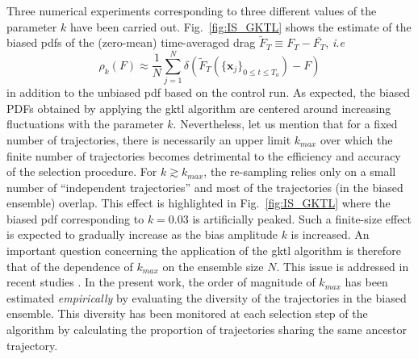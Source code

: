 \documentclass[pre,aps,floatfix,10pt,superscriptaddress, notitlepage,preprint]{revtex4-1}
\begin{document}
Three numerical experiments corresponding to three different values of the parameter $k$ have been carried out.
%
%
%
%
Fig.~\ref{fig:IS_GKTL} shows the estimate of the biased \ac{pdf}s of the (zero-mean) time-averaged drag $\tilde F_T \equiv F_T - \overline{F_T}$, \emph{i.e}
\begin{equation}
  \label{eq:estimate_biased_measure}
  \rho_k(F) 
  \approx \frac{1}{N}\sum_{j=1}^{N}\delta(\tilde F_{T}(\{\mathbf{x}_j\}_{0\leq t \leq T_a}) - F)
\end{equation}
in addition to the unbiased \ac{pdf} based on the control run.
As expected, the biased PDFs obtained by applying the \ac{gktl} algorithm are centered around increasing fluctuations with the parameter $k$.
%
%
Nevertheless, let us mention that for a fixed number of trajectories, there is necessarily an upper limit $k_{max}$ over which the finite number of trajectories becomes detrimental to the efficiency and accuracy of the selection procedure.
%
For $k \gtrsim k_{max}$, the re-sampling relies only on a small number of ``independent trajectories'' and most of the trajectories (in the biased ensemble) overlap. 
This effect is highlighted in Fig.~\ref{fig:IS_GKTL} where the biased \ac{pdf} corresponding to $k=0.03$ is artificially peaked.
%
Such a finite-size effect is expected to gradually increase as the bias amplitude  $k$ is increased.
%
An important question concerning the application of the \ac{gktl} algorithm is therefore that of the dependence of $k_{max}$ on the ensemble size $N$. This issue is addressed in recent studies \cite{nemoto2017finite,Guevara_Hidalgo_2018}.
%
In the present work, the order of magnitude of $k_{max}$ has been estimated \emph{empirically} by evaluating the diversity of the trajectories in the biased ensemble.
This diversity has been monitored at each selection step of the algorithm by calculating the proportion of trajectories sharing the same ancestor trajectory.
\end{document}
